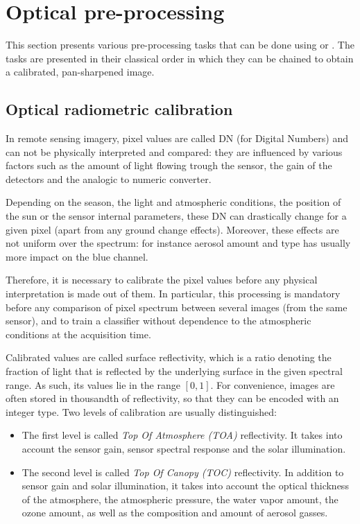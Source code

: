\section{Optical pre-processing}\label{sec:optpreproc}

This section presents various pre-processing tasks that can be done
using \app or \mont. The tasks are presented in their classical order
in which they can be chained to obtain a calibrated, pan-sharpened image. 

\subsection{Optical radiometric calibration}\label{ssec:optcal}

In remote sensing imagery, pixel values are called DN (for Digital
Numbers) and can not be physically interpreted and compared: they are
influenced by various factors such as the amount of light flowing
trough the sensor, the gain of the detectors and the analogic to
numeric converter.

Depending on the season, the light and atmospheric conditions, the
position of the sun or the sensor internal parameters, these DN can
drastically change for a given pixel (apart from any ground change
effects). Moreover, these effects are not uniform over the spectrum:
for instance aerosol amount and type has usually more impact on the
blue channel.

Therefore, it is necessary to calibrate the pixel values before any
physical interpretation is made out of them. In particular, this
processing is mandatory before any comparison of pixel spectrum
between several images (from the same sensor), and to train a
classifier without dependence to the atmospheric conditions at the
acquisition time.

Calibrated values are called surface reflectivity, which is a ratio
denoting the fraction of light that is reflected by the underlying
surface in the given spectral range. As such, its values lie in the
range $[0,1]$. For convenience, images are often stored in thousandth
of reflectivity, so that they can be encoded with an integer type.
Two levels of calibration are usually distinguished:

\begin{itemize}
\item The first level is called \emph{Top Of Atmosphere (TOA)}
  reflectivity. It takes into account the sensor gain, sensor spectral
  response and the solar illumination.
\item The second level is called \emph{Top Of Canopy (TOC)}
  reflectivity. In addition to sensor gain and solar illumination, it
  takes into account the optical thickness of the atmosphere, the
  atmospheric pressure, the water vapor amount, the ozone amount, as
  well as the composition and amount of aerosol gasses.
\end{itemize}

